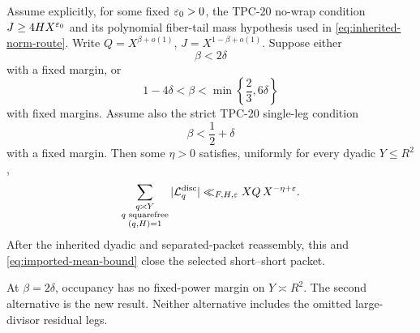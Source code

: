 \begin{theorem}
\label{thm:main-closure}
Assume explicitly, for some fixed \(\varepsilon_0>0\), the TPC-20 no-wrap
condition \(J\ge4HX^{\varepsilon_0}\) and its polynomial fiber-tail mass hypothesis
used in \eqref{eq:inherited-norm-route}.  Write
\(Q=X^{\beta+o(1)}\), \(J=X^{1-\beta+o(1)}\).  Suppose either
\begin{equation}
 \beta<2\delta
 \label{eq:occupancy-region}
\end{equation}
with a fixed margin, or
\begin{equation}
 1-4\delta<\beta<\min\left\{\frac23,6\delta\right\}
 \label{eq:main-hybrid-region}
\end{equation}
with fixed margins.  Assume also the strict TPC-20 single-leg condition
\begin{equation}
 \beta<\frac12+\delta
 \label{eq:main-single-leg}
\end{equation}
with a fixed margin.  Then some \(\eta>0\) satisfies, uniformly for
every dyadic \(Y\le R^2\),
\begin{equation}
 \sum_{\substack{q\asymp Y\\q\text{ squarefree}\\(q,H)=1}}
 |\mathcal L_q^{\rm disc}|\ll_{F,H,\varepsilon}XQ\,X^{-\eta+\varepsilon}.
 \label{eq:main-discrepancy-bound}
\end{equation}
After the inherited dyadic and separated-packet reassembly, this and
\eqref{eq:imported-mean-bound} close the selected short--short packet.
\end{theorem}

At \(\beta=2\delta\), occupancy has no fixed-power margin on
\(Y\asymp R^2\).  The second alternative is the new result.  Neither
alternative includes the omitted large-divisor residual legs.
